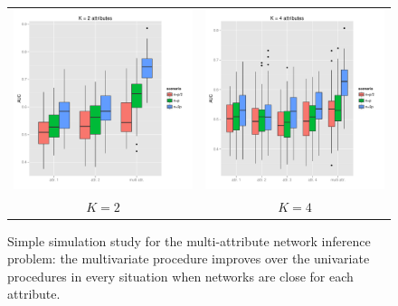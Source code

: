 \begin{figure}[htbp!]
  \centering
  \begin{tabular}{cc}
    \includegraphics[width=.495\textwidth]{figures/res_simu_K=2} &
    \includegraphics[width=.495\textwidth]{figures/res_simu_K=4} \\[1ex]
    $K = 2$ & $K = 4$\\ 
  \end{tabular}

  \caption{Simple  simulation study  for  the multi-attribute  network
    inference problem:  the multivariate  procedure improves  over the
    univariate procedures in every  situation when networks are close
    for each attribute.}
  \label{fig:simu_multi}
\end{figure}
